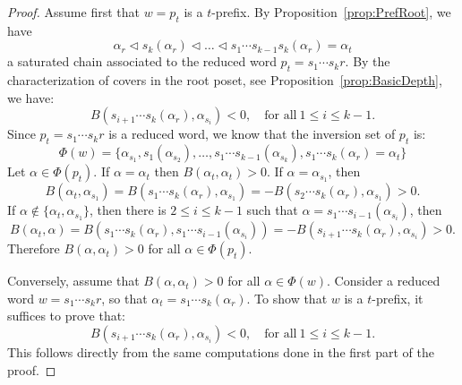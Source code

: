 \documentclass[10pt,a4paper]{amsart}
\begin{document}
\begin{proof}  Assume first that $w=p_t$ is a $t$-prefix. By Proposition~\ref{prop:PrefRoot}, we have
$$
\alpha_{r}\lhd s_k(\alpha_{r})\lhd\dots\lhd s_1\cdots s_{k-1} s_k(\alpha_r)=\alpha_t
$$ 
 a saturated chain associated to the reduced word $p_t=s_1 \cdots s_kr$.  By the characterization of covers in the root poset, see Proposition~\ref{prop:BasicDepth}, we have: 
$$
 B(s_{i+1}\cdots s_k(\alpha_{r}),\alpha_{s_{i}})<0,\quad \textrm{for all} \ 1\leq i\leq k-1.
$$
Since $p_t=s_1\cdots s_kr$ is a reduced word, we know that the inversion set of $p_t$ is:
$$
\Phi(w)=\{\alpha_{s_1},s_1(\alpha_{s_2}),\dots,s_1\cdots s_{k-1}(\alpha_{s_k}),s_1\cdots s_k(\alpha_r)=\alpha_t\}
$$
Let $\alpha\in \Phi(p_t)$. If $\alpha=\alpha_t$ then $B(\alpha_t,\alpha_t)>0$. If $\alpha=\alpha_{s_1}$, then
$$
B(\alpha_t,\alpha_{s_1})=B(s_1\cdots s_k(\alpha_{r}),\alpha_{s_{1}})= -B(s_2\cdots s_k(\alpha_{r}),\alpha_{s_{1}})>0.
$$
If $\alpha\notin\{ \alpha_t,\alpha_{s_1}\}$, then there is $2\leq i\leq k-1$ such that $\alpha=s_1\cdots s_{i-1}(\alpha_{s_{i}})$, then 
$$
 B(\alpha_t,\alpha)=B(s_1\cdots s_k(\alpha_{r}),s_1\cdots s_{i-1}(\alpha_{s_{i}}))=- B(s_{i+1}\cdots s_k(\alpha_r),\alpha_{s_{i}})>0.
$$
Therefore   $B(\alpha,\alpha_t)>0$ for all $\alpha\in \Phi(p_t)$.

\smallskip

Conversely, assume that $B(\alpha,\alpha_t)>0$ for all $\alpha\in \Phi(w)$. Consider a reduced word $w=s_1\cdots s_k r$, so that $\alpha_t=s_1\cdots s_k(\alpha_r)$. To show that $w$ is a $t$-prefix, it suffices to prove that:
$$
 B(s_{i+1}\cdots s_k(\alpha_{r}),\alpha_{s_{i}})<0,\quad \textrm{for all} \ 1\leq i\leq k-1.
$$
This follows directly from the same computations done in the first part of the proof. 
\end{proof}
\end{document}
